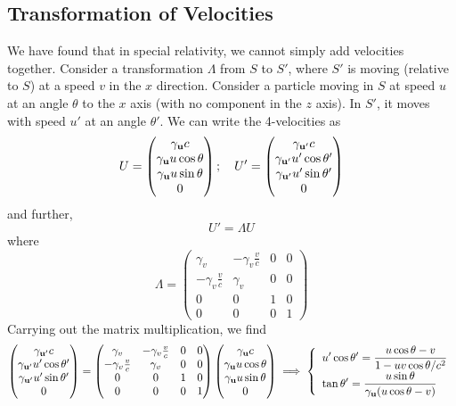 \documentclass{article}
\begin{document}
\subsection{Transformation of Velocities}
We have found that in special relativity, we cannot simply add velocities together. Consider a transformation $\Lambda$ from $S$ to $S'$, where $S'$ is moving (relative to $S$) at a speed $v$ in the $x$ direction. Consider a particle moving in $S$ at speed $u$ at an angle $\theta$ to the $x$ axis (with no component in the $z$ axis). In $S'$, it moves with speed $u'$ at an angle $\theta'$. We can write the 4-velocities as
\[ U = \begin{pmatrix}
	\gamma_{\vb u}c \\
	\gamma_{\vb u}u\cos\theta \\
	\gamma_{\vb u}u\sin\theta \\
	0
\end{pmatrix};\quad U' = \begin{pmatrix}
	\gamma_{\vb u'}c \\
	\gamma_{\vb u'}u'\cos\theta' \\
	\gamma_{\vb u'}u'\sin\theta' \\
	0
\end{pmatrix} \]
and further,
\[ U' = \Lambda U \]
where
\[ \Lambda = \begin{pmatrix}
	\gamma_v & -\gamma_v \frac{v}{c} & 0 & 0 \\
	-\gamma_v \frac{v}{c} & \gamma_v & 0 & 0 \\
	0 & 0 & 1 & 0 \\
	0 & 0 & 0 & 1
\end{pmatrix} \]
Carrying out the matrix multiplication, we find
\[ \begin{pmatrix}
	\gamma_{\vb u'}c \\
	\gamma_{\vb u'}u'\cos\theta' \\
	\gamma_{\vb u'}u'\sin\theta' \\
	0
\end{pmatrix} = \begin{pmatrix}
	\gamma_v & -\gamma_v \frac{v}{c} & 0 & 0 \\
	-\gamma_v \frac{v}{c} & \gamma_v & 0 & 0 \\
	0 & 0 & 1 & 0 \\
	0 & 0 & 0 & 1
\end{pmatrix} \begin{pmatrix}
	\gamma_{\vb u}c \\
	\gamma_{\vb u}u\cos\theta \\
	\gamma_{\vb u}u\sin\theta \\
	0
\end{pmatrix} \implies \left\{ \begin{array}{l}
	\displaystyle
	u'\cos\theta' = \frac{u\cos\theta - v}{1 - uv\cos\theta/c^2} \\
	\displaystyle
	\tan\theta' = \frac{u\sin\theta}{\gamma_{\vb u}(u\cos\theta - v)} \\
\end{array} \right. \]
\end{document}
